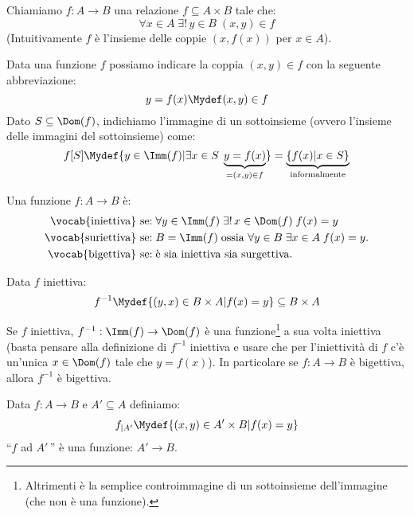 \documentclass[11pt]{scrartcl}
\begin{document}
\begin{definition}[Funzione]
	Chiamiamo  $f:A \rightarrow B$ una relazione $f \subseteq A \times B$ tale che:
	\[ \forall x \in A \; \exists ! \, y \in B \; (x,y) \in f
		\]
		(Intuitivamente $f$ è l'insieme delle coppie $(x,f(x))$ per $x \in A$).
\end{definition}

\begin{notation}
	Data una funzione $f$ possiamo indicare la coppia $(x,y) \in f$ con la seguente abbreviazione:
	\[ y = f(x) \Mydef (x,y) \in f
		\]
	Dato $S \subseteq \Dom(f)$, indichiamo l'immagine di un sottoinsieme (ovvero l'insieme delle immagini del sottoinsieme) come:
	\[ f[S] \Mydef \{y \in \Imm(f)| \exists x \in S \; \underbrace{y = f(x)}_{= (x,y) \in f}\} = \underbrace{\{f(x) | x \in S\}}_{\text{informalmente}}
		\]
\end{notation}

\begin{definition}
	Una funzione $f: A \rightarrow B$ è:
	\[ \begin{split}
		\text{\vocab{iniettiva} se:}\; & \forall y \in \Imm(f)\; \exists! \, x \in \Dom(f) \; f(x) = y\\
		\text{\vocab{suriettiva} se:}\; & B = \Imm(f)\; \text{ossia $\forall y \in B \; \exists x \in A \; f(x) = y$.}\\
		\text{\vocab{bigettiva} se:}\; &\text{è sia iniettiva sia surgettiva.}
	\end{split}
		\]
\end{definition}

\begin{definition}
	Data $f$ iniettiva:
	\[ f^{-1} \Mydef \{(y,x) \in B \times A | f(x) = y\} \subseteq B \times A
		\]
\end{definition}

\begin{remark}
	Se $f$ iniettiva, $f^{-1} : \Imm(f) \rightarrow \Dom(f)$ è una funzione\footnote{Altrimenti è la semplice controimmagine di un sottoinsieme dell'immagine (che non è una funzione).} a
	sua volta iniettiva (basta pensare alla definizione di $f^{-1}$ iniettiva e usare che per l'iniettività di $f$ c'è un'unica $x \in \Dom(f)$ tale che $y = f(x)$).
	In particolare se $f : A \rightarrow B$ è bigettiva, allora $f^{-1}$ è bigettiva.
\end{remark}

\begin{definition}
	Data $f: A \rightarrow B$ e $A' \subseteq A$ definiamo:
	\[ f_{|A'} \Mydef \{(x,y) \in A' \times B | f(x) = y\}
		\]
	 ``$f$  ad $A'$\,'' è una funzione: $A' \rightarrow B$.
\end{definition}
\end{document}
